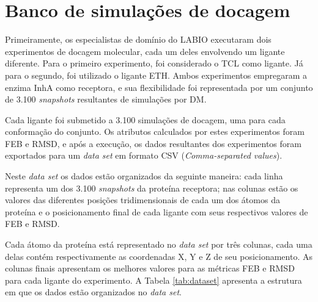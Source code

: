 \section{Banco de simulações de docagem}

Primeiramente, os especialistas de domínio do LABIO executaram dois experimentos de docagem molecular, cada um deles envolvendo um ligante diferente. Para o primeiro experimento, foi considerado o TCL como ligante. Já para o segundo, foi utilizado o ligante ETH. Ambos experimentos empregaram a enzima InhA como receptora, e sua flexibilidade foi representada por um conjunto de 3.100 \emph{snapshots} resultantes de simulações por DM. 

Cada ligante foi submetido a 3.100 simulações de docagem, uma para cada conformação do conjunto. Os atributos calculados por estes experimentos foram FEB e RMSD, e após a execução, os dados resultantes dos experimentos foram exportados para um \emph{data set} em formato CSV (\emph{Comma-separated values}).

Neste \emph{data set} os dados estão organizados da seguinte maneira: cada linha representa um dos 3.100 \emph{snapshots} da proteína receptora; nas colunas estão os valores das diferentes posições tridimensionais de cada um dos átomos da proteína e o posicionamento final de cada ligante com seus respectivos valores de FEB e RMSD.

Cada átomo da proteína está representado no \emph{data set} por três colunas, cada uma delas contém respectivamente as coordenadas X, Y e Z de seu posicionamento. As colunas finais apresentam os melhores valores para as métricas FEB e RMSD para cada ligante do experimento. A Tabela \ref{tab:dataset} apresenta a estrutura em que os dados estão organizados no \emph{data set}.

